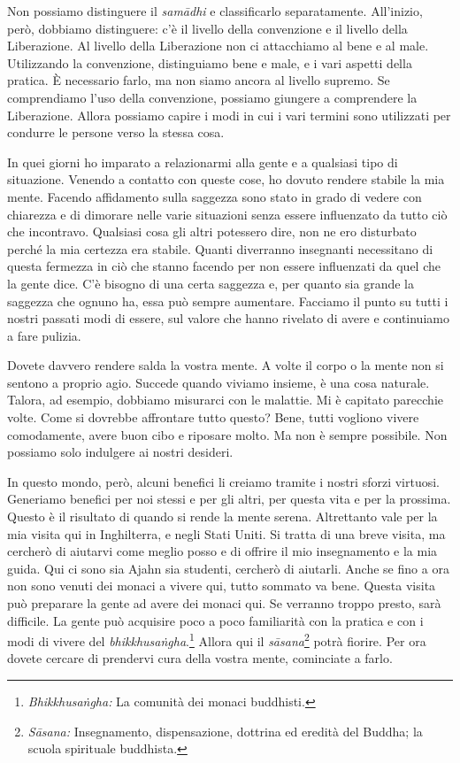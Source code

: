 Non possiamo distinguere il \emph{samādhi} e classificarlo
separatamente. All'inizio, però, dobbiamo distinguere: c'è il livello
della convenzione e il livello della Liberazione. Al livello della
Liberazione non ci attacchiamo al bene e al male. Utilizzando la
convenzione, distinguiamo bene e male, e i vari aspetti della pratica. È
necessario farlo, ma non siamo ancora al livello supremo. Se
comprendiamo l'uso della convenzione, possiamo giungere a comprendere la
Liberazione. Allora possiamo capire i modi in cui i vari termini sono
utilizzati per condurre le persone verso la stessa cosa.

In quei giorni ho imparato a relazionarmi alla gente e a qualsiasi tipo
di situazione. Venendo a contatto con queste cose, ho dovuto rendere
stabile la mia mente. Facendo affidamento sulla saggezza sono stato in
grado di vedere con chiarezza e di dimorare nelle varie situazioni senza
essere influenzato da tutto ciò che incontravo. Qualsiasi cosa gli altri
potessero dire, non ne ero disturbato perché la mia certezza era
stabile. Quanti diverranno insegnanti necessitano di questa fermezza in
ciò che stanno facendo per non essere influenzati da quel che la gente
dice. C'è bisogno di una certa saggezza e, per quanto sia grande la
saggezza che ognuno ha, essa può sempre aumentare. Facciamo il punto su
tutti i nostri passati modi di essere, sul valore che hanno rivelato di
avere e continuiamo a fare pulizia.

Dovete davvero rendere salda la vostra mente. A volte il corpo o la
mente non si sentono a proprio agio. Succede quando viviamo insieme, è
una cosa naturale. Talora, ad esempio, dobbiamo misurarci con le
malattie. Mi è capitato parecchie volte. Come si dovrebbe affrontare
tutto questo? Bene, tutti vogliono vivere comodamente, avere buon cibo e
riposare molto. Ma non è sempre possibile. Non possiamo solo indulgere
ai nostri desideri.

In questo mondo, però, alcuni benefici li creiamo tramite i nostri
sforzi virtuosi. Generiamo benefici per noi stessi e per gli altri, per
questa vita e per la prossima. Questo è il risultato di quando si rende
la mente serena. Altrettanto vale per la mia visita qui in Inghilterra,
e negli Stati Uniti. Si tratta di una breve visita, ma cercherò di
aiutarvi come meglio posso e di offrire il mio insegnamento e la mia
guida. Qui ci sono sia Ajahn sia studenti, cercherò di aiutarli. Anche
se fino a ora non sono venuti dei monaci a vivere qui, tutto sommato va
bene. Questa visita può preparare la gente ad avere dei monaci qui. Se
verranno troppo presto, sarà difficile. La gente può acquisire poco a
poco familiarità con la pratica e con i modi di vivere del
\emph{bhikkhusaṅgha}.\footnote{\emph{Bhikkhusaṅgha:} La comunità dei
  monaci buddhisti.} Allora qui il \emph{sāsana}\footnote{\emph{Sāsana:}
  Insegnamento, dispensazione, dottrina ed eredità del Buddha; la scuola
  spirituale buddhista.} potrà fiorire. Per ora dovete cercare di
prendervi cura della vostra mente, cominciate a farlo.

